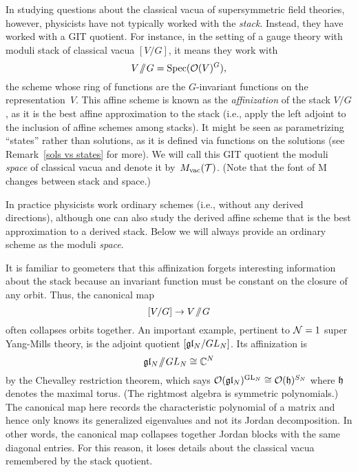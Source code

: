 \documentclass[11pt]{amsart}
\def\Spec{\text{Spec}}
\begin{document}
In studying questions about the classical vacua of supersymmetric field theories, however, physicists have not typically worked with the {\em stack}.
Instead, they have worked with a GIT quotient.
For instance, in the setting of a gauge theory with moduli stack of classical vacua $[V/G]$, it means they work with 
\[
V\Sslash G = \Spec(\cO(V)^G),
\]
the scheme whose ring of functions are the $G$-invariant functions on the representation~$V$.
This affine scheme is known as the {\em affinization} of the stack $V/G$, as it is the best affine approximation to the stack (i.e., apply the left adjoint to the inclusion of affine schemes among stacks).
It might be seen as parametrizing ``states'' rather than solutions, 
as it is defined via functions on the solutions (see Remark~\ref{sols vs states} for more).
We will call this GIT quotient the moduli {\em space} of classical vacua and denote it by~$M_{\rm vac}(\mathcal T)$.
(Note that the font of M changes between stack and space.)

\begin{rmk}
In practice physicists work ordinary schemes (i.e., without any derived directions), 
although one can also study the derived affine scheme that is the best approximation to a derived stack.
Below we will always provide an ordinary scheme as the moduli {\em space}.
\end{rmk}

It is familiar to geometers that this affinization forgets interesting information about the stack because an invariant function must be constant on the closure of any orbit.
Thus, the canonical map
\[
[V/G] \to V\!\sslash\! G
\]
often collapses orbits together.
An important example, pertinent to $\mathcal N =1$ super Yang-Mills theory, is the adjoint quotient $[\mathfrak{g} \mathfrak{l}_N/ GL_N]$.
Its affinization is
\[
\mathfrak{g} \mathfrak{l}_N \!\sslash\! GL_N \cong \mathbb C^N
\]
by the Chevalley restriction theorem, 
which says $\mathcal O(\mathfrak{g} \mathfrak{l}_N)^{{\rm GL}_N} \cong \mathcal O(\frak{h})^{S_N}$ where $\frak{h}$ denotes the maximal torus.
(The rightmost algebra is symmetric polynomials.)
The canonical map here records the characteristic polynomial of a matrix and hence only knows its generalized eigenvalues and not its Jordan decomposition.
In other words, the canonical map collapses together Jordan blocks with the same diagonal entries.
For this reason, it loses details about the classical vacua remembered by the stack quotient.
\end{document}
